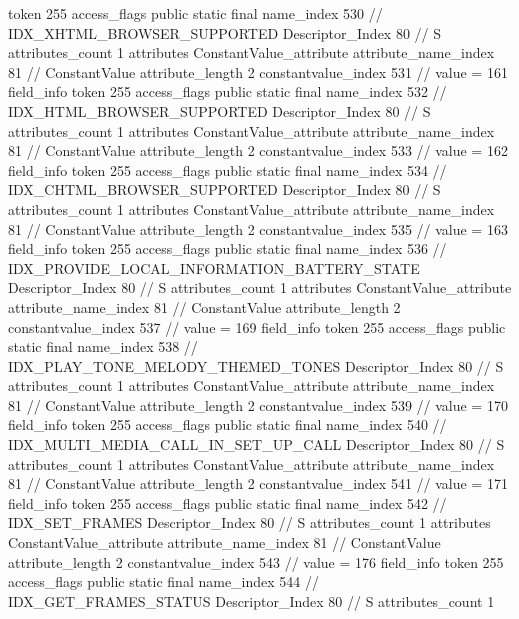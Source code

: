{{{{{				token	255
				access_flags	public static final
				name_index	530		// IDX_XHTML_BROWSER_SUPPORTED
				Descriptor_Index	80		// S
				attributes_count	1
				attributes {
				ConstantValue_attribute {
					attribute_name_index	81		// ConstantValue
					attribute_length	2
					constantvalue_index	531		// value = 161
				}
				}
			}
			field_info {
				token	255
				access_flags	public static final
				name_index	532		// IDX_HTML_BROWSER_SUPPORTED
				Descriptor_Index	80		// S
				attributes_count	1
				attributes {
				ConstantValue_attribute {
					attribute_name_index	81		// ConstantValue
					attribute_length	2
					constantvalue_index	533		// value = 162
				}
				}
			}
			field_info {
				token	255
				access_flags	public static final
				name_index	534		// IDX_CHTML_BROWSER_SUPPORTED
				Descriptor_Index	80		// S
				attributes_count	1
				attributes {
				ConstantValue_attribute {
					attribute_name_index	81		// ConstantValue
					attribute_length	2
					constantvalue_index	535		// value = 163
				}
				}
			}
			field_info {
				token	255
				access_flags	public static final
				name_index	536		// IDX_PROVIDE_LOCAL_INFORMATION_BATTERY_STATE
				Descriptor_Index	80		// S
				attributes_count	1
				attributes {
				ConstantValue_attribute {
					attribute_name_index	81		// ConstantValue
					attribute_length	2
					constantvalue_index	537		// value = 169
				}
				}
			}
			field_info {
				token	255
				access_flags	public static final
				name_index	538		// IDX_PLAY_TONE_MELODY_THEMED_TONES
				Descriptor_Index	80		// S
				attributes_count	1
				attributes {
				ConstantValue_attribute {
					attribute_name_index	81		// ConstantValue
					attribute_length	2
					constantvalue_index	539		// value = 170
				}
				}
			}
			field_info {
				token	255
				access_flags	public static final
				name_index	540		// IDX_MULTI_MEDIA_CALL_IN_SET_UP_CALL
				Descriptor_Index	80		// S
				attributes_count	1
				attributes {
				ConstantValue_attribute {
					attribute_name_index	81		// ConstantValue
					attribute_length	2
					constantvalue_index	541		// value = 171
				}
				}
			}
			field_info {
				token	255
				access_flags	public static final
				name_index	542		// IDX_SET_FRAMES
				Descriptor_Index	80		// S
				attributes_count	1
				attributes {
				ConstantValue_attribute {
					attribute_name_index	81		// ConstantValue
					attribute_length	2
					constantvalue_index	543		// value = 176
				}
				}
			}
			field_info {
				token	255
				access_flags	public static final
				name_index	544		// IDX_GET_FRAMES_STATUS
				Descriptor_Index	80		// S
				attributes_count	1
}}}}}
